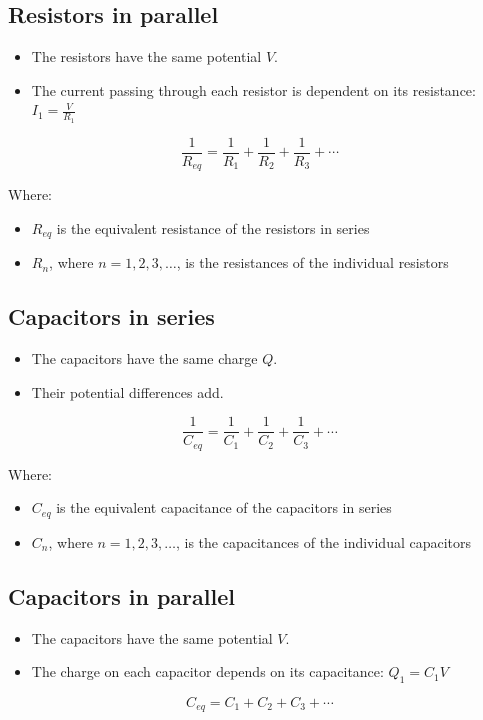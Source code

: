 \documentclass[11pt]{article}
\begin{document}
\subsection{Resistors in parallel}
\label{sec:org614a741}
\begin{itemize}
\item The resistors have the same potential \(V\).
\item The current passing through each resistor is dependent on its resistance: \(I_1 = \frac{V}{R_1}\)
\end{itemize}
\[\frac{1}{R_{eq}} = \frac{1}{R_1} + \frac{1}{R_2} + \frac{1}{R_3} + \cdots\]

Where:
\begin{itemize}
\item \(R_{eq}\) is the equivalent resistance of the resistors in series
\item \(R_n\), where \(n = 1, 2, 3, \ldots\), is the resistances of the individual resistors
\end{itemize}
\subsection{Capacitors in series}
\label{sec:orgfd44637}
\begin{itemize}
\item The capacitors have the same charge \(Q\).
\item Their potential differences add.
\end{itemize}

\[\frac{1}{C_{eq}} = \frac{1}{C_1} + \frac{1}{C_2} + \frac{1}{C_3} + \cdots\]

Where:
\begin{itemize}
\item \(C_{eq}\) is the equivalent capacitance of the capacitors in series
\item \(C_n\), where \(n = 1, 2, 3, \ldots\), is the capacitances of the individual capacitors
\end{itemize}
\subsection{Capacitors in parallel}
\label{sec:org3dad770}
\begin{itemize}
\item The capacitors have the same potential \(V\).
\item The charge on each capacitor depends on its capacitance: \(Q_1 = C_1 V\)
\end{itemize}
\[C_{eq} = C_1 + C_2 + C_3 + \cdots\]
\end{document}
